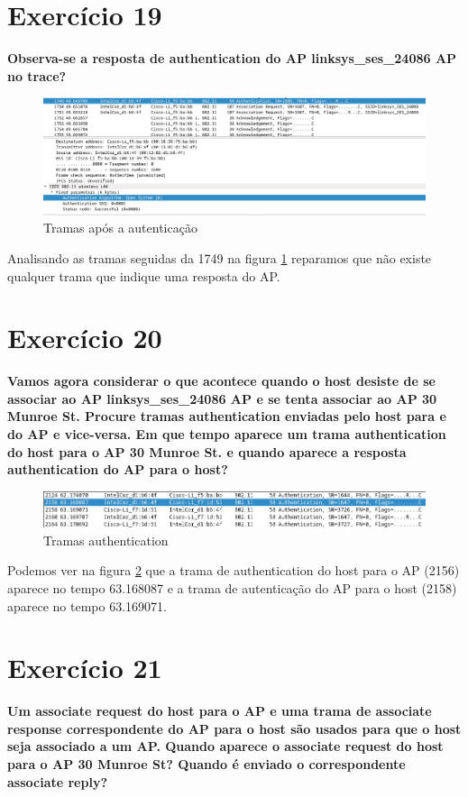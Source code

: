 \documentclass[a4paper]{report}
\begin{document}
\section{Exercício 19}
\textbf{Observa-se a resposta de authentication do AP linksys\_ses\_24086 AP no
trace?}\\

\begin{figure}[H]
    \centering 
    \includegraphics[width=\textwidth]{images/tramasEx19.png}  
    \caption{Tramas após a autenticação}
    \label{fig:tramasEx19}
\end{figure}
Analisando as tramas seguidas da 1749 na figura \ref{fig:tramasEx19} reparamos 
que não existe qualquer trama que indique uma resposta do AP.

\section{Exercício 20}
\textbf{Vamos agora considerar o que acontece quando o host desiste de se
associar ao AP linksys\_ses\_24086 AP e se tenta associar ao AP 30 Munroe
St. Procure tramas authentication enviadas pelo host para e do AP e
vice-versa. Em que tempo aparece um trama authentication do host para o AP
30 Munroe St. e quando aparece a resposta authentication do AP para o
host?}\\

\begin{figure}[H]
    \centering 
    \includegraphics[width=\textwidth]{images/respostaEx20.png}  
    \caption{Tramas authentication}
    \label{fig:respostaEx20}
\end{figure}
Podemos ver na figura \ref{fig:respostaEx20} que a trama de authentication do
host para o AP (2156) aparece no tempo 63.168087 e a trama de autenticação do 
AP para o host (2158) aparece no tempo 63.169071. 

\section{Exercício 21}
\textbf{Um associate request do host para o AP e uma trama de associate response
correspondente do AP para o host são usados para que o host seja associado a
um AP. Quando aparece o associate request do host para o AP 30 Munroe St?
Quando é enviado o correspondente associate reply?}\\
\end{document}
